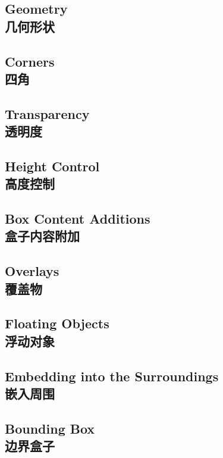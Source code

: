 \subsection{Geometry\\几何形状}

\subsection{Corners\\四角}\label{subsec:corners}

\subsection{Transparency\\透明度}

\subsection{Height Control\\高度控制}\label{sec:heightcontrol}

\subsection{Box Content Additions\\盒子内容附加}\label{subsec:contentadditions}

\subsection{Overlays\\覆盖物}\label{subsec:overlays}

\subsection{Floating Objects\\浮动对象}

\subsection{Embedding into the Surroundings\\嵌入周围}\label{subsec:surroundings}

\subsection{Bounding Box\\边界盒子}

